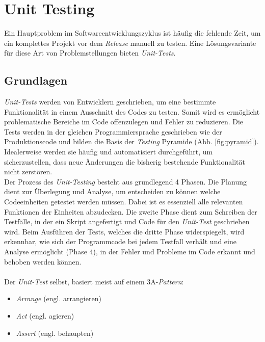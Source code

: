 \section{Unit Testing}
Ein Hauptproblem im Softwareentwicklungszyklus ist häufig die fehlende Zeit, um ein komplettes Projekt vor dem \textit{Release} manuell zu testen. \cite*{SoftwareQualityLab} Eine Lösungsvariante für diese Art von Problemstellungen bieten \textit{Unit-Tests}. 

\subsection{Grundlagen}
\textit{Unit-Tests} werden von Entwicklern geschrieben, um eine bestimmte Funktionalität in einem Ausschnitt des Codes zu testen. Somit wird es ermöglicht problematische Bereiche im Code offenzulegen und Fehler zu reduzieren. \cite*{tosunEffectivenessUnitTests2018} Die Tests werden in der gleichen Programmiersprache geschrieben wie der Produktionscode und bilden die Basis der \textit{Testing} Pyramide (Abb. \ref{fig:pyramid}). Idealerweise werden sie häufig und automatisiert durchgeführt, um sicherzustellen, dass neue Änderungen die bisherig bestehende Funktionalität nicht zerstören. \cite*{TestingPyramidStrategic2024}\\
Der Prozess des \textit{Unit-Testing} besteht aus grundlegend 4 Phasen. Die Planung dient zur Überlegung und Analyse, um entscheiden zu können welche Codeeinheiten getestet werden müssen. Dabei ist es essenziell alle relevanten Funktionen der Einheiten abzudecken. \cite*{bakharevUnitTestingDefinition2023} Die zweite Phase dient zum Schreiben der Testfälle, in der ein Skript angefertigt und Code für den \textit{Unit-Test} geschrieben wird. \cite*{bakharevUnitTestingDefinition2023} Beim Ausführen der Tests, welches die dritte Phase widerspiegelt, wird erkennbar, wie sich der Programmcode bei jedem Testfall verhält und eine Analyse ermöglicht (Phase 4), in der Fehler und Probleme im Code erkannt und behoben werden können.\cite*{bakharevUnitTestingDefinition2023}\\\\
Der \textit{Unit-Test} selbst, basiert meist auf einem 3A-\textit{Pattern}:
\begin{itemize}
    \setlength{\parskip}{0.5pt}
    \item \textit{Arrange} (engl. arrangieren)
    \item \textit{Act} (engl. agieren)
    \item \textit{Assert} (engl. behaupten)
\end{itemize}

